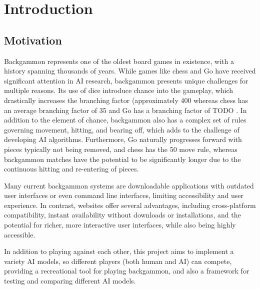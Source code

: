 \chapter{Introduction}
\label{cha:intro}
\section{Motivation}
Backgammon represents one of the oldest board games in existence, with a history spanning thousands of years. While games like chess and Go have received significant attention in AI research, backgammon presents unique challenges for multiple reasons. Its use of dice introduce chance into the gameplay, which drastically increases the branching factor (approximately 400 \cite{branchingfactor} whereas chess has an average branching factor of 35 \cite{chessfactor} and Go has a branching factor of TODO \cite{gofactor}. In addition to the element of chance, backgammon also has a complex set of rules governing movement, hitting, and bearing off, which adds to the challenge of developing AI algorithms. Furthermore, Go naturally progresses forward with pieces typically not being removed, and chess has the 50 move rule, whereas backgammon matches have the potential to be significantly longer due to the continuous hitting and re-entering of pieces.

Many current backgammon systems are downloadable applications with outdated user interfaces or even command line interfaces, limiting accessibility and user experience. In contrast, websites offer several advantages, including cross-platform compatibility, instant availability without downloads or installations, and the potential for richer, more interactive user interfaces, while also being highly accessible.

In addition to playing against each other, this project aims to implement a variety AI models, so different players (both human and AI) can compete, providing a recreational tool for playing backgammon, and also a framework for testing and comparing different AI models. 

